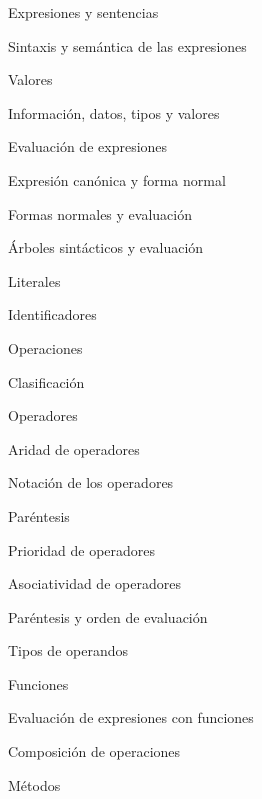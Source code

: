 \begin{longenum}
\begin{longenum}
        \begin{longenum}
            \item Expresiones y sentencias
            \item Sintaxis y semántica de las expresiones
        \end{longenum}
        \item Valores
        \begin{longenum}
            \item Información, datos, tipos y valores
            \item Evaluación de expresiones
            \item Expresión canónica y forma normal
            \item Formas normales y evaluación
            \item Árboles sintácticos y evaluación
            \item Literales
            \item Identificadores
        \end{longenum}
        \item Operaciones
        \begin{longenum}
            \item Clasificación
            \item Operadores
            \begin{longenum}
                \item Aridad de operadores
                \item Notación de los operadores
                \item Paréntesis
                \item Prioridad de operadores
                \item Asociatividad de operadores
                \item Paréntesis y orden de evaluación
                \item Tipos de operandos
            \end{longenum}
            \item Funciones
            \begin{longenum}
                \item Evaluación de expresiones con funciones
                \item Composición de operaciones
            \end{longenum}
            \item Métodos
        \end{longenum}

\end{longenum}
\end{longenum}
